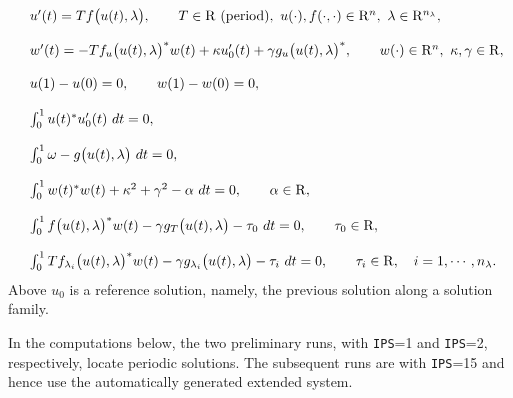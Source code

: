 \documentclass[12pt]{report}
\def\R{{\rm R}}
\def\Rn{{\rm R}^n}
\begin{document}
\begin{equation} \begin{array}{cl}
  &u'(t)  = T f \bigl( u(t),\lambda \bigr) ,
  \qquad T\in \R {\rm ~(period)},~ u(\cdot),f(\cdot,\cdot) \in \Rn, 
  ~ \lambda \in \R^{n_{\lambda}},  \\
  & \cr
  &w'(t)  = -Tf_u\bigl( u(t),\lambda \bigr)^{*} w(t) 
  + \kappa u_0'(t) 
  + \gamma g_u\bigl( u(t),\lambda \bigr)^{*}, 
  \qquad w(\cdot) \in \Rn,~ \kappa, \gamma \in \R, \\
  & \cr
  &u(1) - u(0) = 0, \qquad w(1) - w(0) = 0,  \\
  & \cr  
  &\int_{0}^{1} u(t)^{*} u_0'(t)~ dt = 0,  \\
  & \cr
  &\int_{0}^{1}  \omega - g\bigl(u(t),\lambda\bigr)  ~dt = 0,  \\
  & \cr
  &\int_0^{1}  w(t)^{*}w(t)
  + \kappa^2 + \gamma^{2} - \alpha ~ dt = 0, 
  \qquad \alpha \in \R,  \\ 
  & \cr
  &\int_0^{1}  f\bigl( u(t),\lambda \bigr)^{*}w(t) 
  - \gamma g_{T}\bigl( u(t),\lambda \bigr)
  - \tau_0  ~ dt= 0, \qquad \tau_0 \in \R,  \\
  & \cr
  &\int_0^{1}  T f_{\lambda_i}\bigl( u(t),\lambda \bigr)^{*}w(t)
  - \gamma g_{\lambda_i}\bigl( u(t),\lambda \bigr)
  - \tau_i  ~dt= 0, 
  \qquad \tau_i \in \R, \quad i=1, \cdots, n_{\lambda}.\\
\end{array} \end{equation}
Above  $u_0$ is a reference solution, namely, the previous solution along 
a solution family.  

\newpage
In the computations below, the two preliminary runs, with {\tt IPS}=1 and {\tt IPS}=2,
respectively, locate periodic solutions. 
The subsequent runs are with {\tt IPS}=15 and hence use the automatically
 generated extended system.
\end{document}
